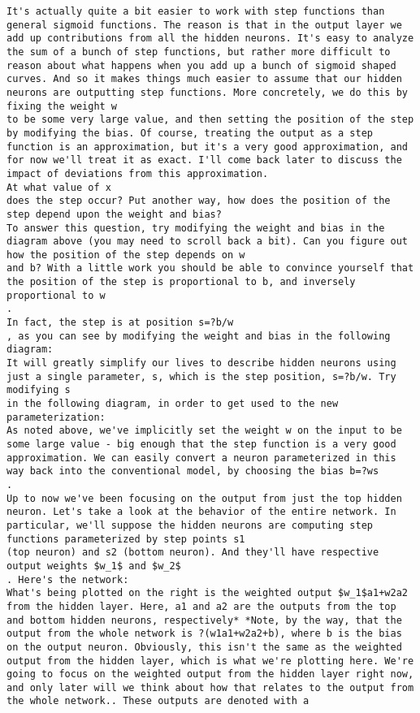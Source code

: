 \begin{lstlisting}
It's actually quite a bit easier to work with step functions than general sigmoid functions. The reason is that in the output layer we add up contributions from all the hidden neurons. It's easy to analyze the sum of a bunch of step functions, but rather more difficult to reason about what happens when you add up a bunch of sigmoid shaped curves. And so it makes things much easier to assume that our hidden neurons are outputting step functions. More concretely, we do this by fixing the weight w
to be some very large value, and then setting the position of the step by modifying the bias. Of course, treating the output as a step function is an approximation, but it's a very good approximation, and for now we'll treat it as exact. I'll come back later to discuss the impact of deviations from this approximation.
At what value of x
does the step occur? Put another way, how does the position of the step depend upon the weight and bias?
To answer this question, try modifying the weight and bias in the diagram above (you may need to scroll back a bit). Can you figure out how the position of the step depends on w
and b? With a little work you should be able to convince yourself that the position of the step is proportional to b, and inversely proportional to w
.
In fact, the step is at position s=?b/w
, as you can see by modifying the weight and bias in the following diagram:
It will greatly simplify our lives to describe hidden neurons using just a single parameter, s, which is the step position, s=?b/w. Try modifying s
in the following diagram, in order to get used to the new parameterization:
As noted above, we've implicitly set the weight w on the input to be some large value - big enough that the step function is a very good approximation. We can easily convert a neuron parameterized in this way back into the conventional model, by choosing the bias b=?ws
.
Up to now we've been focusing on the output from just the top hidden neuron. Let's take a look at the behavior of the entire network. In particular, we'll suppose the hidden neurons are computing step functions parameterized by step points s1
(top neuron) and s2 (bottom neuron). And they'll have respective output weights $w_1$ and $w_2$
. Here's the network:
What's being plotted on the right is the weighted output $w_1$a1+w2a2 from the hidden layer. Here, a1 and a2 are the outputs from the top and bottom hidden neurons, respectively* *Note, by the way, that the output from the whole network is ?(w1a1+w2a2+b), where b is the bias on the output neuron. Obviously, this isn't the same as the weighted output from the hidden layer, which is what we're plotting here. We're going to focus on the weighted output from the hidden layer right now, and only later will we think about how that relates to the output from the whole network.. These outputs are denoted with a

\end{lstlisting}

